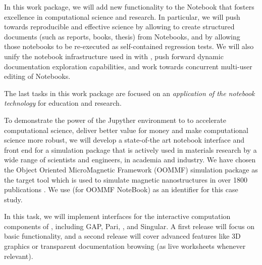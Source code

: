 \begin{workpackage}
\begin{wpdescription}

    In this work package, we will add new functionality to the \Jupyter
    Notebook that fosters excellence in computational science and
    research. In particular, we will push towards reproducible and
    effective science by allowing to create structured
    documents (such as reports, books, thesis) from Notebooks, and by
    allowing those notebooks to be re-executed as self-contained
    regression tests. We will also unify the notebook infrastructure
    used in \Sage with \Jupyter, push forward dynamic documentation
    exploration capabilities, and work towards concurrent multi-user
    editing of Notebooks.

  The last tasks in this work package are focused on an
  \emph{application of the \Jupyter notebook technology} for education
  and research. 

    
  To demonstrate the power of the Jupyther environment to to
  accelerate computational science, deliver better value for money and
  make computational science more robust, we will develop a
  state-of-the art \Jupyter notebook interface and front end for a
  simulation package that is actively used in materials research by a
  wide range of scientists and engineers, in academia and industry. We
  have chosen the Object Oriented MicroMagnetic Framework (OOMMF)
  simulation package \cite{OOMMF-url} as the target tool which is used
  to simulate magnetic nanostructures in over 1800 publications
  \cite{OOMMF-citations-url}. We use \OOMMFNB{} (for OOMMF NoteBook)
  as an identifier for this case study.
\end{wpdescription}

\begin{tasklist}
\begin{task}[title=Uniform notebook interface for all interactive components,id=ipython-kernels]
  In this task, we will implement \Jupyter interfaces for the
  interactive computation components of \TheProject, including GAP,
  Pari, \Sage, and Singular. A first release
   will focus on basic functionality,
  and a second release  will cover advanced
  features like 3D graphics or transparent documentation browsing (as
  live worksheets whenever relevant).


\end{task}
\end{tasklist}
\end{workpackage}
